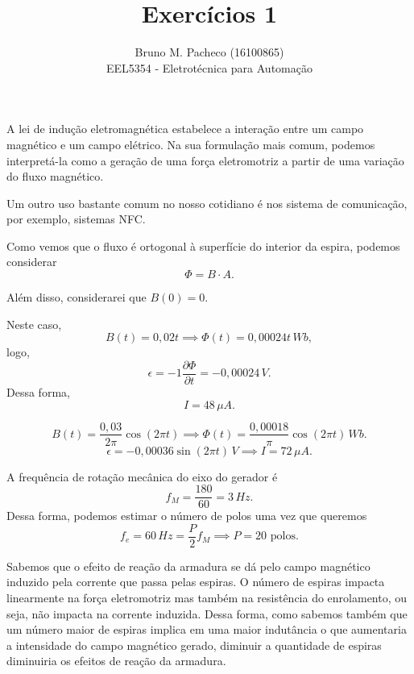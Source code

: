 \documentclass[a4paper]{report}
\begin{document}
 
\title{Exercícios 1}
\author{Bruno M. Pacheco (16100865)\\
EEL5354 - Eletrotécnica para Automação}
 
\maketitle
 

A lei de indução eletromagnética estabelece a interação entre um campo magnético e um campo elétrico. Na sua formulação mais comum, podemos interpretá-la como a geração de uma força eletromotriz a partir de uma variação do fluxo magnético.

Um outro uso bastante comum no nosso cotidiano é nos sistema de comunicação, por exemplo, sistemas NFC.


Como vemos que o fluxo é ortogonal à superfície do interior da espira, podemos considerar \[
\Phi = B \cdot  A
.\] 

Além disso, considerarei que $B\left( 0 \right) = 0$.


Neste caso, \[
B(t) = 0,02 t \implies \Phi(t) = 0,00024 t\,Wb
,\] logo, \[
\epsilon = -1 \frac{\partial \Phi}{\partial t} = -0,00024\,V
.\] Dessa forma, \[
I = 48\,\mu A
.\] 


\[
B(t) = \frac{0,03}{2\pi} \cos\left( 2\pi t \right) \implies \Phi(t) = \frac{0,00018}{\pi}\cos\left( 2\pi t \right) \, Wb
.\] \[
\epsilon = -0,00036 \sin\left( 2\pi t \right) \,V \implies I = 72\,\mu A
.\]


A frequência de rotação mecânica do eixo do gerador é \[
f_M = \frac{180}{60} = 3\,Hz
.\] Dessa forma, podemos estimar o número de polos uma vez que queremos \[
f_e = 60\,Hz = \frac{P}{2} f_M \implies P = 20\text{ polos}
.\]


Sabemos que o efeito de reação da armadura se dá pelo campo magnético induzido pela corrente que passa pelas espiras. O número de espiras impacta linearmente na força eletromotriz mas também na resistência do enrolamento, ou seja, não impacta na corrente induzida. Dessa forma, como sabemos também que um número maior de espiras implica em uma maior indutância o que aumentaria a intensidade do campo magnético gerado, diminuir a quantidade de espiras diminuiria os efeitos de reação da armadura.
\end{document}
